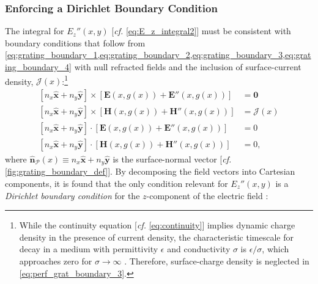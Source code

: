 \subsubsection{Enforcing a Dirichlet Boundary Condition}\label{sec:dirch_bound} 
The integral for $E_z'' (x,y)$ [\emph{cf.\@} \cref{eq:E_z_integral2}] must be consistent with boundary conditions that follow from \cref{eq:grating_boundary_1,eq:grating_boundary_2,eq:grating_boundary_3,eq:grating_boundary_4} with null refracted fields and the inclusion of surface-current density, $\pmb{\mathscr{J}} (x)$:\footnote{While the continuity equation [\emph{cf.\@} \cref{eq:continuity}] implies dynamic charge density in the presence of current density, the characteristic timescale for decay in a medium with permittivity $\epsilon$ and conductivity $\sigma$ is $\epsilon / \sigma$, which approaches zero for $\sigma \to \infty$ \cite[\emph{cf.\@} footnote~\ref{footnote:skin_depth}]{Griffiths17}. Therefore, surface-charge density is neglected in \cref{eq:perf_grat_boundary_3}.}
\begin{subequations}
\begin{align}
 \left[ n_x \mathbold{\hat{x}} + n_y \mathbold{\hat{y}}  \right] \times \left[ \mathbold{E} \left( x, g(x) \right) + \mathbold{E''} \left( x, g(x) \right) \right] &= \mathbf{0} \label{eq:perf_grat_boundary_1} \\
 \left[ n_x \mathbold{\hat{x}} + n_y \mathbold{\hat{y}}  \right] \times \left[\mathbold{H} \left( x, g(x) \right)  + \mathbold{H''} \left( x, g(x) \right) \right] &= \pmb{\mathscr{J}} (x) \label{eq:perf_grat_boundary_2} \\
 \left[ n_x \mathbold{\hat{x}} + n_y \mathbold{\hat{y}}  \right] \cdot \left[ \mathbold{E} \left( x, g(x) \right) + \mathbold{E''} \left( x, g(x) \right) \right] &= 0 \label{eq:perf_grat_boundary_3} \\
 \left[ n_x \mathbold{\hat{x}} + n_y \mathbold{\hat{y}}  \right] \cdot \left[ \mathbold{H} \left( x, g(x) \right) + \mathbold{H''} \left( x, g(x) \right) \right] &= 0 \label{eq:perf_grat_boundary_4} , 
 \end{align}
\end{subequations} 
where $\mathbold{\hat{n}}_{\mathcal{P}}(x) \equiv n_x \mathbold{\hat{x}} + n_y \mathbold{\hat{y}}$ is the surface-normal vector [\emph{cf.\@} \cref{fig:grating_boundary_def}]. 
By decomposing the field vectors into Cartesian components, it is found that the only condition relevant for $E_z'' (x,y)$ is a \emph{Dirichlet boundary condition} for the $z$-component of the electric field \cite{Petit80,Jackson75}:
